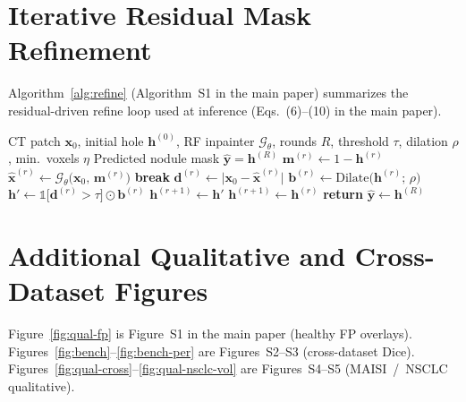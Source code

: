 \documentclass[twoside]{article}
\newcommand{\mainEqInject}{(6)}
\newcommand{\mainEqSampler}{(7)}
\newcommand{\mainEqResidual}{(9)}
\newcommand{\mainEqUpdate}{(10)}
\begin{document}
\section{Iterative Residual Mask Refinement}
\label{sec:supp:alg}
Algorithm~\ref{alg:refine} (Algorithm~S1 in the main paper) summarizes
the residual-driven refine loop used at inference
(Eqs.~\mainEqInject{}--\mainEqUpdate{} in the main paper).

\begin{algorithm}[t]
\caption{Iterative residual mask refinement for nodule localization}
\label{alg:refine}
\begin{algorithmic}[1]
\REQUIRE CT patch $\mathbf{x}_0$, initial hole $\mathbf{h}^{(0)}$, RF
inpainter $\mathcal{G}_\theta$, rounds $R$, threshold $\tau$, dilation
$\rho$, min.\ voxels $\eta$
\ENSURE Predicted nodule mask $\hat{\mathbf{y}}=\mathbf{h}^{(R)}$
\STATE $\mathbf{m}^{(r)} \gets 1-\mathbf{h}^{(r)}$
\STATE $\hat{\mathbf{x}}^{(r)} \gets \mathcal{G}_\theta\!\bigl(
  \mathbf{x}_0,\,\mathbf{m}^{(r)}\bigr)$
  \COMMENT{Eqs.~\mainEqInject{},~\mainEqSampler{}}
\STATE \textbf{break}
\ENDIF
\STATE $\mathbf{d}^{(r)} \gets \bigl|\mathbf{x}_0-\hat{\mathbf{x}}^{(r)}\bigr|$
  \COMMENT{Eq.~\mainEqResidual{}}
\STATE $\mathbf{b}^{(r)} \gets \mathrm{Dilate}\!\bigl(\mathbf{h}^{(r)};\,\rho\bigr)$
\STATE $\mathbf{h}' \gets \mathbb{1}\!\bigl[\mathbf{d}^{(r)}>\tau\bigr]
  \odot \mathbf{b}^{(r)}$
  \COMMENT{Eq.~\mainEqUpdate{}}
\STATE $\mathbf{h}^{(r+1)} \gets \mathbf{h}'$
\ELSE
\STATE $\mathbf{h}^{(r+1)} \gets \mathbf{h}^{(r)}$
\ENDIF
\ENDFOR
\STATE \textbf{return} $\hat{\mathbf{y}} \gets \mathbf{h}^{(R)}$
\end{algorithmic}
\end{algorithm}
\FloatBarrier

\section{Additional Qualitative and Cross-Dataset Figures}
\label{sec:supp:extra-figs}
Figure~\ref{fig:qual-fp} is Figure~S1 in the main paper (healthy FP
overlays).
Figures~\ref{fig:bench}--\ref{fig:bench-per} are Figures~S2--S3
(cross-dataset Dice).
Figures~\ref{fig:qual-cross}--\ref{fig:qual-nsclc-vol} are
Figures~S4--S5 (MAISI~/~NSCLC qualitative).
\end{document}
